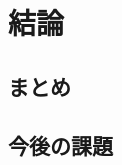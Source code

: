 \documentclass[\homedir/main.tex]{subfiles}
\begin{document}
\setcounter{chapter}{5}
\chapter{結論}\label{sec:summary}
\section{まとめ}

\section{今後の課題}
\end{document}
